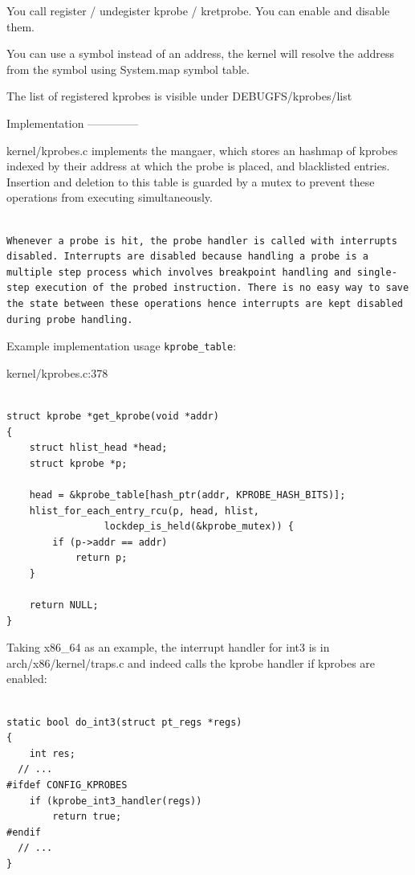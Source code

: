 You call register / undegister kprobe / kretprobe. You can enable and
disable them.

You can use a symbol instead of an address, the kernel will resolve
the address from the symbol using System.map symbol table.

The list of registered kprobes is visible under DEBUGFS/kprobes/list


Implementation
--------------

kernel/kprobes.c implements the mangaer, which stores an hashmap of
kprobes indexed by their address at which the probe is placed, and
blacklisted entries. Insertion and deletion to this table is guarded
by a mutex to prevent these operations from executing simultaneously.

\begin{verbatim}

Whenever a probe is hit, the probe handler is called with interrupts disabled. Interrupts are disabled because handling a probe is a multiple step process which involves breakpoint handling and single-step execution of the probed instruction. There is no easy way to save the state between these operations hence interrupts are kept disabled during probe handling.

\end{verbatim}

Example implementation usage \verb|kprobe_table|:

kernel/kprobes.c:378

\begin{verbatim}

struct kprobe *get_kprobe(void *addr)
{
	struct hlist_head *head;
	struct kprobe *p;

	head = &kprobe_table[hash_ptr(addr, KPROBE_HASH_BITS)];
	hlist_for_each_entry_rcu(p, head, hlist,
				 lockdep_is_held(&kprobe_mutex)) {
		if (p->addr == addr)
			return p;
	}

	return NULL;
}

\end{verbatim}

Taking x86\_64 as an example, the interrupt handler for int3 is in
arch/x86/kernel/traps.c and indeed calls the kprobe handler if kprobes
are enabled:

\begin{verbatim}

static bool do_int3(struct pt_regs *regs)
{
	int res;
  // ...
#ifdef CONFIG_KPROBES
	if (kprobe_int3_handler(regs))
		return true;
#endif
  // ...
}

\end{verbatim}

